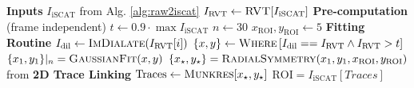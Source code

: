 \clearpage
\begin{algorithm}
    \caption{Transverse Localization algorithm}
    \label{alg:2d_track}
    \begin{algorithmic}
\Statex \textbf{Inputs} 
        \State $I_{\mathrm{iSCAT}}$ \Comment from Alg. \ref{alg:raw2iscat}
        \State $I_{\mathrm{RVT}} \gets \textsc{RVT}[I_\mathrm{iSCAT}]$
\Statex   
        \Statex \textbf{Pre-computation} (frame independent)
        \State $t \gets 0.9 \cdot \max{I_\mathrm{iSCAT}}$ 
        \State $n \gets 30$ 
        \State $x_\mathrm{ROI}, y_\mathrm{ROI} \gets 5$ 
\Statex \textbf{Fitting Routine}
            \State $I_{\mathrm{dil}} \gets \textsc{ImDialate}(I_\mathrm{RVT}[i])$
            \State $\{x, y\} \gets \textsc{Where}\left[I_\mathrm{dil} == I_\mathrm{RVT} \land I_\mathrm{RVT} > t\right]$ 
            \State $\{x_1, y_1\}|_{n} = \textsc{GaussianFit}(x,y)$ 
            \State $\{x_\star, y_\star\} = \textsc{RadialSymmetry}(x_1,y_1, x_\mathrm{ROI}, y_\mathrm{ROI})$ \Comment from \cite{parthasarathyRapidAccurateParticle2012} 
        \EndFor
\Statex \textbf{2D Trace Linking}
        \State $\mathrm{Traces} \gets \textsc{Munkres}[{x_\star, y_\star}]$ 
        \State $\mathrm{ROI} = I_\mathrm{iSCAT}[Traces]$ 
    \end{algorithmic}
\end{algorithm}

